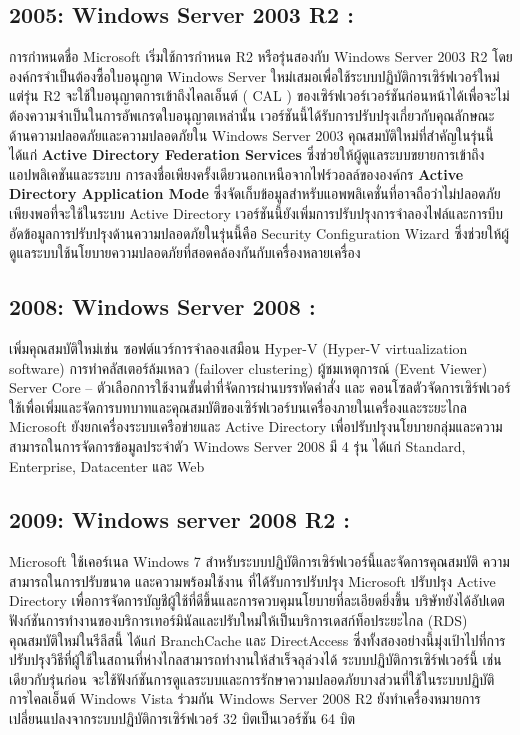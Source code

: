 \hspace{0cm}\subsection{2005: Windows Server 2003 R2 :}การกำหนดชื่อ Microsoft เริ่มใช้การกำหนด R2 หรือรุ่นสองกับ Windows Server 2003 R2 โดยองค์กรจำเป็นต้องซื้อใบอนุญาต Windows Server ใหม่เสมอเพื่อใช้ระบบปฏิบัติการเซิร์ฟเวอร์ใหม่ แต่รุ่น R2 จะใช้ใบอนุญาตการเข้าถึงไคลเอ็นต์ ( CAL ) ของเซิร์ฟเวอร์เวอร์ชันก่อนหน้าได้เพื่อจะไม่ต้องความจำเป็นในการอัพเกรดใบอนุญาตเหล่านั้น เวอร์ชันนี้ได้รับการปรับปรุงเกี่ยวกับคุณลักษณะด้านความปลอดภัยและความปลอดภัยใน Windows Server 2003 คุณสมบัติใหม่ที่สำคัญในรุ่นนี้ได้แก่ \textbf{Active Directory Federation Services }ซึ่งช่วยให้ผู้ดูแลระบบขยายการเข้าถึงแอปพลิเคชันและระบบ การลงชื่อเพียงครั้งเดียวนอกเหนือจากไฟร์วอลล์ขององค์กร \textbf{Active Directory Application Mode} ซึ่งจัดเก็บข้อมูลสำหรับแอพพลิเคชั่นที่อาจถือว่าไม่ปลอดภัยเพียงพอที่จะใช้ในระบบ Active Directory เวอร์ชันนี้ยังเพิ่มการปรับปรุงการจำลองไฟล์และการบีบอัดข้อมูลการปรับปรุงด้านความปลอดภัยในรุ่นนี้คือ Security Configuration Wizard ซึ่งช่วยให้ผู้ดูแลระบบใช้นโยบายความปลอดภัยที่สอดคล้องกันกับเครื่องหลายเครื่อง  

\hspace{0cm}\subsection{2008: Windows Server 2008 :}เพิ่มคุณสมบัติใหม่เช่น ซอฟต์แวร์การจำลองเสมือน Hyper-V (Hyper-V virtualization software) การทำคลัสเตอร์ล้มเหลว (failover clustering) ผู้ชมเหตุการณ์ (Event Viewer) Server Core -- ตัวเลือกการใช้งานขั้นต่ำที่จัดการผ่านบรรทัดคำสั่ง และ คอนโซลตัวจัดการเซิร์ฟเวอร์ ใช้เพื่อเพิ่มและจัดการบทบาทและคุณสมบัติของเซิร์ฟเวอร์บนเครื่องภายในเครื่องและระยะไกล  Microsoft ยังยกเครื่องระบบเครือข่ายและ Active Directory เพื่อปรับปรุงนโยบายกลุ่มและความสามารถในการจัดการข้อมูลประจำตัว Windows Server 2008 มี 4 รุ่น ได้แก่ Standard, Enterprise, Datacenter และ Web  
\clearpage

\hspace{0cm}\subsection{2009: Windows server 2008 R2 :}Microsoft ใช้เคอร์เนล Windows 7 สำหรับระบบปฏิบัติการเซิร์ฟเวอร์นี้และจัดการคุณสมบัติ ความสามารถในการปรับขนาด  และความพร้อมใช้งาน ที่ได้รับการปรับปรุง Microsoft ปรับปรุง Active Directory เพื่อการจัดการบัญชีผู้ใช้ที่ดีขึ้นและการควบคุมนโยบายที่ละเอียดยิ่งขึ้น บริษัทยังได้อัปเดตฟังก์ชันการทำงานของบริการเทอร์มินัลและปรับใหม่ให้เป็นบริการเดสก์ท็อประยะไกล (RDS) คุณสมบัติใหม่ในรีลีสนี้ ได้แก่ BranchCache และ DirectAccess ซึ่งทั้งสองอย่างนี้มุ่งเป้าไปที่การปรับปรุงวิธีที่ผู้ใช้ในสถานที่ห่างไกลสามารถทำงานให้สำเร็จลุล่วงได้ ระบบปฏิบัติการเซิร์ฟเวอร์นี้ เช่นเดียวกับรุ่นก่อน จะใช้ฟังก์ชันการดูแลระบบและการรักษาความปลอดภัยบางส่วนที่ใช้ในระบบปฏิบัติการไคลเอ็นต์ Windows Vista ร่วมกัน Windows Server 2008 R2 ยังทำเครื่องหมายการเปลี่ยนแปลงจากระบบปฏิบัติการเซิร์ฟเวอร์ 32 บิตเป็นเวอร์ชัน 64 บิต


